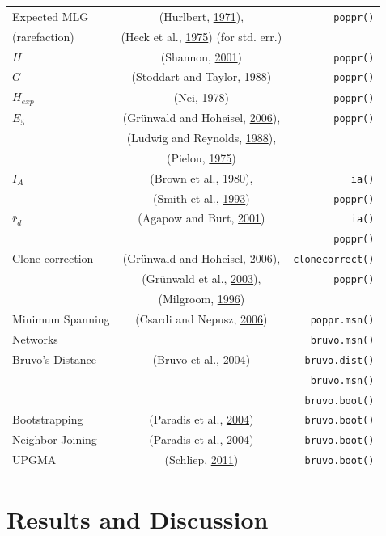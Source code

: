 \documentclass[double,12pt]{beavtex}
\begin{document}
\begin{longtable}[h!]{@{}lcr@{}}
  Expected MLG  & (Hurlbert, \protect\hyperlink{ref-hurlbert1971nonconcept}{1971}), & \texttt{poppr()}\tabularnewline
  (rarefaction) & (Heck et al., \protect\hyperlink{ref-heck1975explicit}{1975}) (for std. err.) & \tabularnewline
  \hline
  \(H\) & (Shannon, \protect\hyperlink{ref-shannon2001mathematical}{2001}) & \texttt{poppr()}\tabularnewline
  \hline
  \(G\) & (Stoddart and Taylor,
  \protect\hyperlink{ref-stoddart1988genotypic}{1988}) & \texttt{poppr()}\tabularnewline
  \hline
  \(H_{exp}\) & (Nei, \protect\hyperlink{ref-Nei:1978}{1978}) & \texttt{poppr()}\tabularnewline
  \hline
  \(E_{5}\) & (Grünwald and Hoheisel,
  \protect\hyperlink{ref-grunwald2006hierarchical}{2006}), & \texttt{poppr()}\tabularnewline
   & (Ludwig and Reynolds,
  \protect\hyperlink{ref-ludwig1988statistical}{1988}), & \tabularnewline
   & (Pielou, \protect\hyperlink{ref-pielou1975ecological}{1975}) & \tabularnewline
  \hline
  \(I_A\) & (Brown et al., \protect\hyperlink{ref-brown1980multilocus}{1980}), & \texttt{ia()}\tabularnewline 
   & (Smith et al., \protect\hyperlink{ref-smith1993how}{1993}) & \texttt{poppr()}\tabularnewline
  \hline
  \(\bar{r}_d\) &  (Agapow and Burt, \protect\hyperlink{ref-Agapow_2001}{2001}) & \texttt{ia()}\tabularnewline 
  & & \texttt{poppr()}\tabularnewline
  \hline
  Clone correction & (Grünwald and Hoheisel,
  \protect\hyperlink{ref-grunwald2006hierarchical}{2006}), & \texttt{clonecorrect()}\tabularnewline 
   & (Grünwald et al., \protect\hyperlink{ref-grunwald2003analysis}{2003}), & \texttt{poppr()}\tabularnewline
   & (Milgroom, \protect\hyperlink{ref-milgroom1996recombination}{1996}) & \tabularnewline
  \hline
  Minimum Spanning & (Csardi and Nepusz, \protect\hyperlink{ref-csardi2006igraph}{2006}) & \texttt{poppr.msn()}\tabularnewline 
  Networks & & \texttt{bruvo.msn()}\tabularnewline
  \hline
  Bruvo's Distance & (Bruvo et al., \protect\hyperlink{ref-bruvo2004simple}{2004}) & \texttt{bruvo.dist()}\tabularnewline 
  & & \texttt{bruvo.msn()}\tabularnewline 
  & & \texttt{bruvo.boot()}\tabularnewline
  \hline
  Bootstrapping & (Paradis et al., \protect\hyperlink{ref-paradis2004ape}{2004}) & \texttt{bruvo.boot()}\tabularnewline 
  \hline
  Neighbor Joining & (Paradis et al., \protect\hyperlink{ref-paradis2004ape}{2004}) & \texttt{bruvo.boot()}\tabularnewline
  \hline
  UPGMA & (Schliep, \protect\hyperlink{ref-phangorn}{2011}) & \texttt{bruvo.boot()}\tabularnewline 
  \bottomrule
  \end{longtable}
  
  \section{Results and Discussion}\label{results-and-discussion}
  
\end{document}

